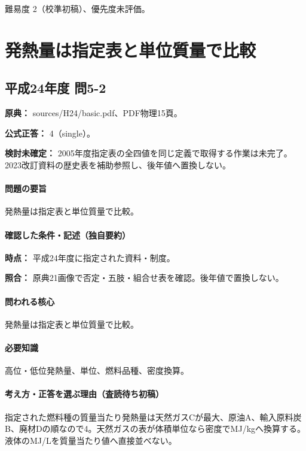 \par 難易度 2（校準初稿）、優先度未評価。

\section{発熱量は指定表と単位質量で比較}

\subsection{平成24年度 問5-2}
\label{q:h24-reg-basic-5-2}

\noindent\textbf{原典：} sources/H24/basic.pdf、PDF物理15頁。

\textbf{公式正答：} 4（single）。

\par\textbf{検討未確定：} 2005年度指定表の全四値を同じ定義で取得する作業は未完了。2023改訂資料の歴史表を補助参照し、後年値へ置換しない。

\paragraph{問題の要旨} 発熱量は指定表と単位質量で比較。

\paragraph{確認した条件・記述（独自要約）}\mbox{}\par

\noindent\textbf{時点：} 平成24年度に指定された資料・制度。\par

\noindent\textbf{照合：} 原典21画像で否定・五肢・組合せ表を確認。後年値で置換しない。\par

\paragraph{問われる核心} 発熱量は指定表と単位質量で比較。

\paragraph{必要知識} 高位・低位発熱量、単位、燃料品種、密度換算。

\paragraph{考え方・正答を選ぶ理由（査読待ち初稿）} 指定された燃料種の質量当たり発熱量は天然ガスCが最大、原油A、輸入原料炭B、廃材Dの順なので4。天然ガスの表が体積単位なら密度でMJ/kgへ換算する。液体のMJ/Lを質量当たり値へ直接並べない。

